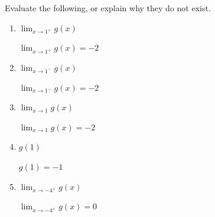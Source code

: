 \documentclass{article}
\begin{document}
\begin{enumerate}[resume]
{    \graphcommand{}

  }

  Evaluate the following, or explain why they do not exist. 
    \begin{enumerate}
    \item
      \begin{problem}
        $\displaystyle \lim_{x \rightarrow 1^+} g(x)$
      \end{problem}

      \begin{solution}
          $\displaystyle \lim_{x \rightarrow 1^+} g(x) = -2$
      \end{solution}


    \item
      \begin{problem}
        $\displaystyle \lim_{x \rightarrow 1^-} g(x)$
      \end{problem}

      \begin{solution}
          $\displaystyle \lim_{x \rightarrow 1^-} g(x) = -2$
      \end{solution}

    \item
      \begin{problem}
        $\displaystyle \lim_{x \rightarrow 1} g(x)$
      \end{problem}

      \begin{solution}
          $\displaystyle \lim_{x \rightarrow 1} g(x) = -2$
      \end{solution}

    \item
      \begin{problem}
        $g(1)$
      \end{problem}

      \begin{solution}
        $g(1) = -1$
      \end{solution}

    \item
      \begin{problem}
        $\displaystyle \lim_{x \rightarrow -4^+} g(x)$
      \end{problem}

      \begin{solution}
          $\displaystyle \lim_{x \rightarrow -4^+} g(x)=0$
      \end{solution}
      


\end{enumerate}
\end{enumerate}
\end{document}
